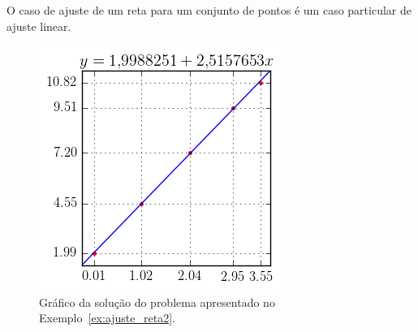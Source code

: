 \begin{obs}O caso de ajuste de um reta para um conjunto de pontos é um caso particular de ajuste linear.\end{obs}

\begin{figure}
  \centering
  \includegraphics{cap_ajuste/pics/ex_ajuste_reta2/ex_ajuste_reta2}
  \caption{Gráfico da solução do problema apresentado no Exemplo~\ref{ex:ajuste_reta2}.}
  \label{fig:ex_ajuste_reta2}
\end{figure}

